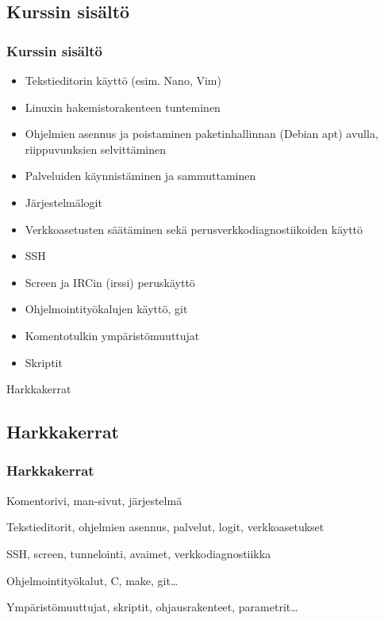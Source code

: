 \documentclass[finnish]{beamer}
\begin{document}
\begin{frame}
    \subsection{Kurssin sisältö}
    \frametitle{Kurssin sisältö}
    \begin{itemize}
        \item Tekstieditorin käyttö (esim. Nano, Vim)
        \item Linuxin hakemistorakenteen tunteminen
        \item Ohjelmien asennus ja poistaminen paketinhallinnan (Debian apt) avulla, riippuvuuksien selvittäminen
        \item Palveluiden käynnistäminen ja sammuttaminen
        \item Järjestelmälogit
        \item Verkkoasetusten säätäminen sekä perusverkkodiagnostiikoiden käyttö
        \item SSH
        \item Screen ja IRCin (irssi) peruskäyttö
        \item Ohjelmointityökalujen käyttö, git
        \item Komentotulkin ympäristömuuttujat
        \item Skriptit



    \end{itemize}
\end{frame}


\begin{frame}{Harkkakerrat}
    \subsection{Harkkakerrat}
    \frametitle{Harkkakerrat}
    \begin{block}{10.11}
        Komentorivi, man-sivut, järjestelmä
    \end{block}
    \pause
    \begin{block}{17.11}
        Tekstieditorit, ohjelmien asennus, palvelut, logit, verkkoasetukset
    \end{block}
    \pause
    \begin{block}{22.11}
        SSH, screen, tunnelointi, avaimet, verkkodiagnostiikka
    \end{block}
    \pause
    \begin{block}{29.11}
        Ohjelmointityökalut, C, make, git\ldots
    \end{block}
    \pause
    \begin{block}{1.12}
        Ympäristömuuttujat, skriptit, ohjausrakenteet, parametrit\ldots
    \end{block}

\end{frame}
\end{document}
